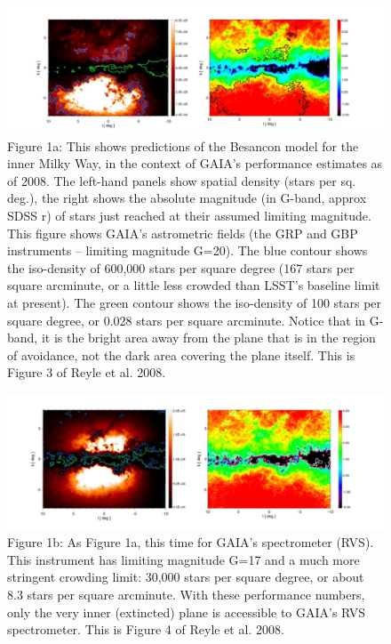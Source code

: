 \begin{figure}[h]
    \centering
    \includegraphics[width=1.0\textwidth]{bulge_fig1a.jpeg}
    \caption{\label{fig:bulge1a}
Figure 1a: This shows predictions of the Besancon model for the inner Milky Way, in the context of GAIA’s performance estimates as of 2008. The left-hand panels show spatial density (stars per sq. deg.), the right shows the absolute magnitude (in G-band, approx SDSS r) of stars just reached at their assumed limiting magnitude. This figure shows GAIA’s astrometric fields (the GRP and GBP instruments – limiting magnitude G=20). The blue contour shows the iso-density of 600,000 stars per square degree (167 stars per square arcminute, or a little less 
crowded than LSST’s baseline limit at present). The green contour shows the iso-density of 100 stars per square degree, or 0.028 stars per square arcminute. Notice that in G-band, it is the bright area away from the plane that is in the region of avoidance, not the dark area covering the plane itself. This is Figure 3 of Reyle et al. 2008. }
\end{figure}

\begin{figure}[h]
    \centering
    \includegraphics[width=1.0\textwidth]{bulge_fig1b.jpeg}
    \caption{\label{fig:bulge1b}
Figure 1b: As Figure 1a, this time for GAIA’s spectrometer (RVS). This instrument has limiting magnitude G=17 and a much more stringent crowding limit: 30,000 stars per square degree, or about 8.3 stars per square arcminute. With these performance numbers, only the very inner (extincted) plane is accessible to GAIA’s RVS spectrometer. This is Figure 4 of Reyle et al. 2008. }
\end{figure}

